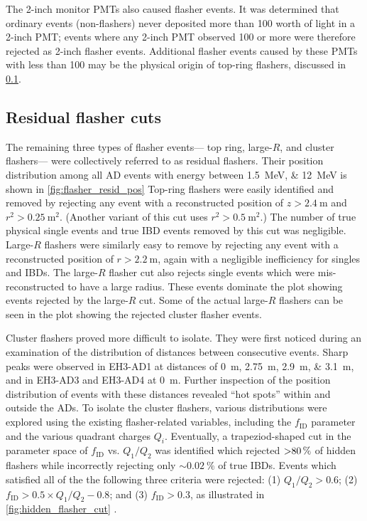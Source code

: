 The 2-inch monitor PMTs also caused flasher events.
It was determined that ordinary events (non-flashers)
never deposited more than \SI{100}{\pe} worth of light
in a 2-inch PMT;
events where any 2-inch PMT observed \SI{100}{\pe} or more
were therefore rejected as 2-inch flasher events.
Additional flasher events caused by these PMTs with less than \SI{100}{\pe}
may be the physical origin of top-ring flashers,
discussed in \cref{subsec:flash_resid}.

\subsection{Residual flasher cuts}
\label{subsec:flash_resid}

The remaining three types of flasher events---%
top ring, large-$R$, and cluster flashers---%
were collectively referred to as residual flashers.
Their position distribution among all AD events
with energy between \SIlist{1.5;12}{\MeV}
is shown in \cref{fig:flasher_resid_pos}
Top-ring flashers were easily identified and removed
by rejecting any event with a reconstructed position
of $z > \SI{2.4}{\m}$ and $r^2 > \SI{0.25}{\m\squared}$.
(Another variant of this cut uses $r^2 > \SI{0.5}{\m\squared}$.)
The number of true physical single events and
true IBD events removed by this cut was negligible.
Large-$R$ flashers were similarly easy to remove
by rejecting any event with a reconstructed position
of $r > \SI{2.2}{\m}$,
again with a negligible inefficiency for singles and IBDs.
The large-$R$ flasher cut also rejects
single events which were mis-reconstructed to have a large radius.
These events dominate the plot showing events rejected by the large-$R$ cut.
Some of the actual large-$R$ flashers can be seen in the plot
showing the rejected cluster flasher events.

Cluster flashers proved more difficult to isolate.
They were first noticed during an examination of the distribution of distances
between consecutive events.
Sharp peaks were observed in EH3-AD1 at distances of \SIlist{0;2.75;2.9;3.1}{\m},
and in EH3-AD3 and EH3-AD4 at \SI{0}{\m}.
Further inspection of the position distribution of events with these distances
revealed ``hot spots'' within and outside the ADs.
To isolate the cluster flashers,
various distributions were explored using the existing flasher-related variables,
including the $f_{\text{ID}}$ parameter and the various quadrant charges $Q_i$.
Eventually, a trapeziod-shaped cut in the parameter space of
$f_{\text{ID}}$ vs. $Q_1/Q_2$ was identified which rejected
$\SI{>80}{\percent}$ of hidden flashers while incorrectly rejecting only
$\sim\SI{0.02}{\percent}$ of true IBDs.
Events which satisfied all of the the following three criteria were rejected:
(1) $Q_1/Q_2 > 0.6$; (2) $f_{\text{ID}} > 0.5 \times Q_1/Q_2 - 0.8$;
and (3) $f_{\text{ID}} > 0.3$,
as illustrated in \cref{fig:hidden_flasher_cut}
\cite{flashers_jinjing,beda_resid_flasher_dt}.


